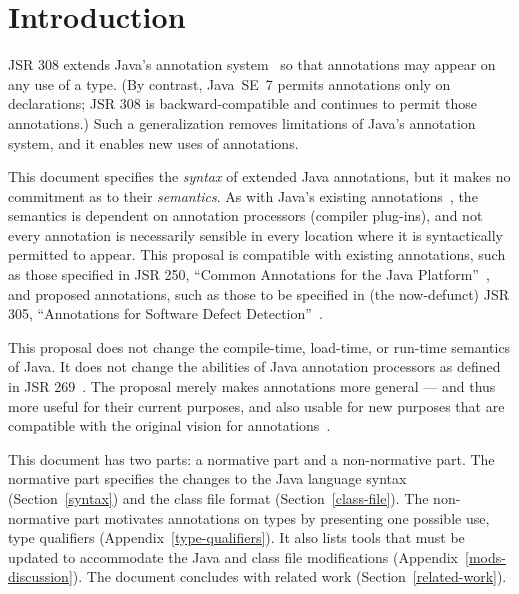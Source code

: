 \documentclass[10pt]{article}
\begin{document}
\tableofcontents

\section{Introduction\label{intro}}

JSR 308 extends Java's annotation system~\cite{JSR175} so that
annotations may appear on any use of a type.
(By contrast, Java~SE~7 permits annotations only on
declarations; JSR 308 is
backward-compatible and continues to permit those annotations.)
Such a generalization removes
limitations of Java's annotation
system, and it enables new uses of annotations.

This document specifies the \emph{syntax} of extended Java annotations, but
it makes no commitment as to their \emph{semantics}.  As with Java's
existing annotations~\cite{JSR175}, the semantics is dependent on annotation processors
(compiler plug-ins), and not every annotation is necessarily sensible in
every location where it is syntactically permitted to appear.
This proposal is compatible with existing annotations,
such as those specified in JSR 250, ``Common Annotations for the Java
Platform''~\cite{JSR250}, and proposed annotations, such as those to be
specified in (the now-defunct) JSR 305, ``Annotations for Software Defect
Detection''~\cite{JSR305}.

This proposal does not change the compile-time, load-time, or run-time
semantics of Java.  It does not change the abilities of Java annotation
processors as defined in JSR 269~\cite{JSR269}.
The proposal merely makes annotations more general --- and thus more useful
for their current purposes, and also usable for new purposes that are
compatible with the original vision for annotations~\cite{JSR175}.

This document has two parts:  a 
normative part and a 
non-normative part.
The normative part specifies the changes to
the Java language syntax (Section~\ref{syntax}) and
the class file format (Section~\ref{class-file}).
%
The non-normative part
motivates annotations on types by presenting one
possible use, type qualifiers
(Appendix~\ref{type-qualifiers}).
It also lists tools that
must be updated to accommodate the Java and class file
modifications (Appendix~\ref{mods-discussion}).
The document concludes with
related work (Section~\ref{related-work}).
\end{document}
